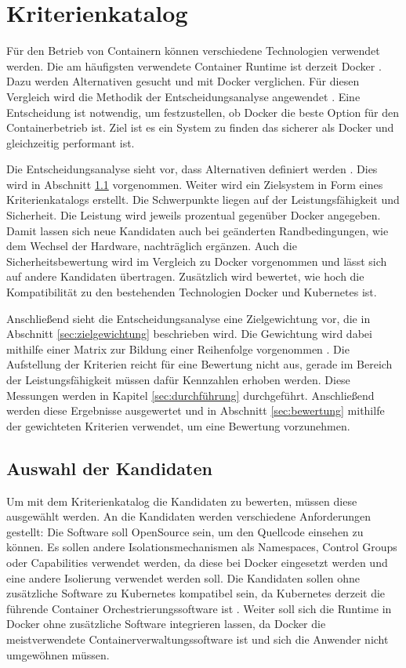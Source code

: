 \chapter{Kriterienkatalog}
Für den Betrieb von Containern können verschiedene Technologien verwendet werden. Die am häufigsten verwendete Container Runtime ist derzeit Docker \cite[vgl.][5]{sysdig.2019}. Dazu werden Alternativen gesucht und mit Docker verglichen.
Für diesen Vergleich wird die Methodik der Entscheidungsanalyse angewendet \cite[vgl.][S. 135 ff.]{Dittmer.2002}.
Eine Entscheidung ist notwendig, um festzustellen, ob Docker die beste Option für den Containerbetrieb ist. Ziel ist es ein System zu finden das sicherer als Docker und gleichzeitig performant ist.

Die Entscheidungsanalyse sieht vor, dass Alternativen definiert werden  \cite[vgl.][139]{Dittmer.2002}. Dies wird in Abschnitt \ref{sec:kandidatenauswahl} vorgenommen. Weiter wird ein Zielsystem in Form eines Kriterienkatalogs erstellt. Die Schwerpunkte liegen auf der Leistungsfähigkeit und Sicherheit. Die Leistung wird jeweils prozentual gegenüber Docker angegeben. Damit lassen sich neue Kandidaten auch bei geänderten Randbedingungen, wie dem Wechsel der Hardware, nachträglich ergänzen. Auch die Sicherheitsbewertung wird im Vergleich zu Docker vorgenommen und lässt sich auf andere Kandidaten übertragen. Zusätzlich wird bewertet, wie hoch die Kompatibilität zu den bestehenden Technologien Docker und Kubernetes ist.

Anschließend sieht die Entscheidungsanalyse eine Zielgewichtung vor, die in Abschnitt \ref{sec:zielgewichtung} beschrieben wird. Die Gewichtung wird dabei mithilfe einer Matrix zur Bildung einer Reihenfolge vorgenommen \cite[vgl.][146]{Dittmer.2002}. Die Aufstellung der Kriterien reicht für eine Bewertung nicht aus, gerade im Bereich der Leistungsfähigkeit müssen dafür Kennzahlen erhoben werden. Diese Messungen werden in Kapitel \ref{sec:durchführung} durchgeführt. Anschließend werden diese Ergebnisse ausgewertet und in Abschnitt \ref{sec:bewertung} mithilfe der gewichteten Kriterien verwendet, um eine Bewertung vorzunehmen. \cite[vgl.][S. 151 f.]{Dittmer.2002}

\section{Auswahl der Kandidaten}
\label{sec:kandidatenauswahl}
Um mit dem Kriterienkatalog die Kandidaten zu bewerten, müssen diese ausgewählt werden. An die Kandidaten werden verschiedene Anforderungen gestellt: Die Software soll OpenSource sein, um den Quellcode einsehen zu können. Es sollen andere Isolationsmechanismen als Namespaces, Control Groups oder Capabilities verwendet werden, da diese bei Docker eingesetzt werden und eine andere Isolierung verwendet werden soll. Die Kandidaten sollen ohne zusätzliche Software zu Kubernetes kompatibel sein, da Kubernetes derzeit die führende Container Orchestrierungssoftware ist \cite[][6]{sysdig.2019}. Weiter soll sich die Runtime in Docker ohne zusätzliche Software integrieren lassen, da Docker die meistverwendete Containerverwaltungssoftware ist \cite[][5]{sysdig.2019} und sich die Anwender nicht umgewöhnen müssen.

